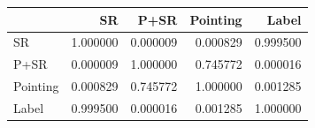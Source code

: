 \begin{tabular}{lrrrr}
\toprule
 & SR & P+SR & Pointing & Label \\
\midrule
SR & 1.000000 & 0.000009 & 0.000829 & 0.999500 \\
P+SR & 0.000009 & 1.000000 & 0.745772 & 0.000016 \\
Pointing & 0.000829 & 0.745772 & 1.000000 & 0.001285 \\
Label & 0.999500 & 0.000016 & 0.001285 & 1.000000 \\
\bottomrule
\end{tabular}
